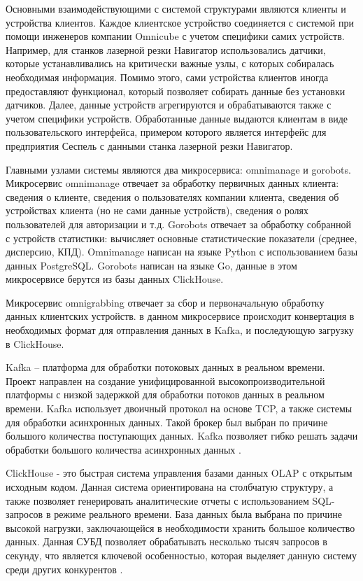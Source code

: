 Основными взаимодействующими с системой структурами являются клиенты и устройства клиентов.
Каждое клиентское устройство соединяется с системой при помощи инженеров компании Omnicube
с учетом специфики самих устройств. Например, для станков лазерной резки Навигатор
использовались датчики, которые устанавливались на критически важные узлы, с которых собиралась необходимая информация.
Помимо этого, сами устройства клиентов иногда предоставляют функционал, который позволяет собирать данные без установки датчиков.
Далее, данные устройств агрегируются и обрабатываются также с учетом специфики устройств.
Обработанные данные выдаются клиентам в виде пользовательского интерфейса, примером которого является
интерфейс для предприятия Сеспель с данными станка лазерной резки Навигатор.

Главными узлами системы являются два микросервиса: omnimanage и gorobots.
Микросервис omnimanage отвечает за обработку первичных данных клиента:
сведения о клиенте, сведения о пользователях компании клиента,
сведения об устройствах клиента (но не сами данные устройств),
сведения о ролях пользователей для авторизации и т.д.
Gorobots отвечает за обработку собранной с устройств
статистики: вычисляет основные статистические показатели (среднее, дисперсию, КПД).
Omnimanage написан на языке Python с использованием базы данных PostgreSQL.
Gorobots написан на языке Go, данные в этом микросервисе берутся из базы данных ClickHouse.

Микросервис omnigrabbing отвечает за сбор и первоначальную обработку данных клиентских устройств.
в данном микросервисе происходит конвертация в необходимых формат для отправления данных в Kafka,
и последующую загрузку в ClickHouse.

Kafka -- платформа для обработки потоковых данных в реальном времени.
Проект направлен на создание унифицированной высокопроизводительной платформы 
с низкой задержкой для обработки потоков данных в реальном времени.
Kafka использует двоичный протокол на основе TCP,
а также системы для обработки асинхронных данных.
Такой брокер был выбран по причине большого количества поступающих данных.
Kafka позволяет гибко решать задачи обработки большого количества асинхронных данных \cite{kafka}.


ClickHouse - это быстрая система управления базами данных OLAP с открытым исходным кодом.
Данная система ориентирована на столбчатую структуру,
а также позволяет генерировать аналитические отчеты с использованием SQL-запросов в режиме реального времени.
База данных была выбрана по причине высокой нагрузки,
заключающейся в необходимости хранить большое количество данных.
Данная СУБД позволяет обрабатывать несколько тысяч запросов в секунду,
что является ключевой особенностью,
которая выделяет данную систему среди других конкурентов \cite{clickhouse}. 

